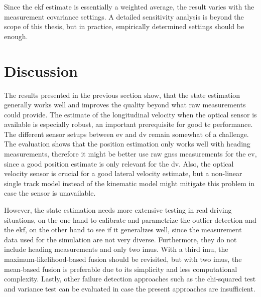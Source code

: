 Since the \gls{ekf} estimate is essentially a weighted average, the result varies with the measurement covariance settings. A detailed sensitivity analysis is beyond the scope of this thesis, but in practice, empirically determined settings should be enough.

\section{Discussion}
The results presented in the previous section show, that the state estimation generally works well and improves the quality beyond what raw measurements could provide. The estimate of the longitudinal velocity when the optical sensor is available is especially robust, an important prerequisite for good \gls{tc} performance. The different sensor setups between \gls{ev} and \gls{dv} remain somewhat of a challenge. The evaluation shows that the position estimation only works well with heading measurements, therefore it might be better use raw \gls{gnss} measurements for the \gls{ev}, since a good position estimate is only relevant for the \gls{dv}. Also, the optical velocity sensor is crucial for a good lateral velocity estimate, but a non-linear single track model instead of the kinematic model might mitigate this problem in case the sensor is unavailable.

However, the state estimation needs more extensive testing in real driving situations, on the one hand to calibrate and parametrize the outlier detection and the \gls{ekf}, on the other hand to see if it generalizes well, since the measurement data used for the simulation are not very diverse. Furthermore, they do not include heading measurements and only two \glspl{imu}. With a third \gls{imu}, the maximum-likelihood-based fusion should be revisited, but with two \glspl{imu}, the mean-based fusion is preferable due to its simplicity and less computational complexity. Lastly, other failure detection approaches such as the chi-squared test and variance test can be evaluated in case the present approaches are insufficient.
